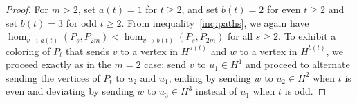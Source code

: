 \documentclass[10pt,a4paper]{amsart}
\newcommand{\homclass}[4]{\hom_{#1\to#2}(#3,#4)}
\begin{document}
\begin{proof}
For $m>2$, set $a(t)=1$ for $t \ge 2$, and set $b(t)=2$ for even $t \ge 2$ and set $b(t)=3$ for odd $t \ge 2$. From inequality~\eqref{inq:paths}, we again have $\homclass{v}{a(t)}{P_s}{P_{2m}} < \homclass{v}{b(t)}{P_s}{P_{2m}}$ for all $s \ge 2$. To exhibit a coloring of $P_t$ that sends $v$ to a vertex in $H^{a(t)}$ and $w$ to a vertex in $H^{b(t)}$, we proceed exactly as in the $m=2$ case: send $v$ to $u_1 \in H^1$ and proceed to alternate sending the vertices of $P_t$ to $u_2$ and $u_1$, ending by sending $w$ to $u_2\in H^2$ when $t$ is even and deviating by sending $w$ to $u_3 \in H^3$ instead of $u_1$ when $t$ is odd. 
\end{proof}
\end{document}
